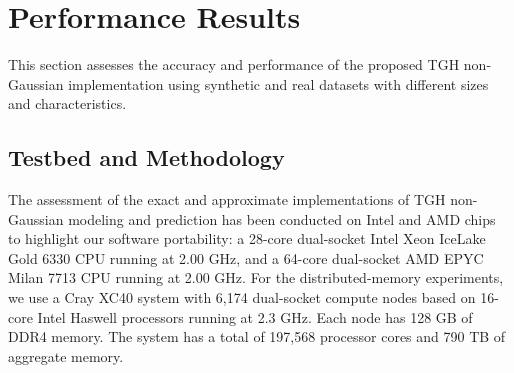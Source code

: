 \documentclass[conference]{IEEEtran}
\begin{document}
\section{Performance Results}
This section assesses the accuracy and performance of 
the proposed TGH non-Gaussian implementation
using synthetic and real  datasets with different sizes and
characteristics. 





\subsection{Testbed and Methodology}
The assessment of the exact and approximate implementations of TGH non-Gaussian modeling and prediction has been conducted  on
Intel and AMD chips to highlight our software
portability: a 28-core dual-socket Intel Xeon IceLake
Gold 6330 CPU running at 2.00 GHz, and a 64-core dual-socket AMD EPYC Milan 7713 CPU running at 2.00 GHz. For the distributed-memory experiments, we use a Cray XC40
system with 6,174 dual-socket compute nodes based on 16-
core Intel Haswell processors running at 2.3 GHz. Each node
has 128 GB of DDR4 memory. The system has a total of
197,568 processor cores and 790 TB of aggregate memory.

\end{document}

